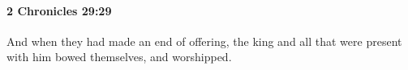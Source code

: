 
		\paragraph{2 Chronicles 29:29} %
			\label{2CHRONICLES-29-29}

			And when they had made an end of offering, the king and all that were present with him bowed themselves, and worshipped.


